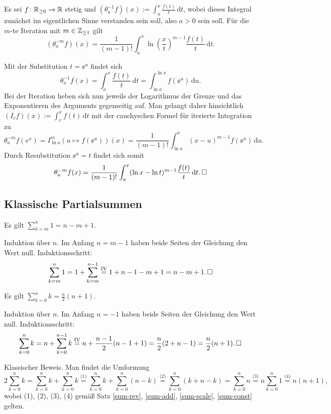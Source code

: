\newpage
\begin{Satz}
Es sei $f\colon\mathbb R_{\ge 0}\to\mathbb R$ stetig und
$(\theta_a^{-1} f)(x):=\int_a^x\frac{f(t)}{t}\,\mathrm dt$,
wobei dieses Integral zunächst im eigentlichen Sinne verstanden sein
soll, also $a>0$ sein soll. Für die $m$-te Iteration mit
$m\in\mathbb Z_{\ge 1}$ gilt%
\[(\theta_a^{-m}f)(x) = \frac{1}{(m-1)!}\int_a^x\ln\left(\frac{x}{t}\right)^{m-1}
\frac{f(t)}{t}\,\mathrm dt.\]
\end{Satz}
Mit der Substitution $t=\ee^u$ findet sich%
\[\theta_a^{-1} f(x) = \int_a^x\frac{f(t)}{t}\,\mathrm dt
= \int_{\ln a}^{\ln x} f(\ee^u)\,\mathrm du.\]
Bei der Iteration heben sich nun jeweils der Logarithmus der Grenze und
das Exponentieren des Arguments gegenseitig auf. Man gelangt daher
hinsichtlich $(I_c f)(x):=\int_c^x f(t)\,\mathrm dt$ mit
der cauchyschen Formel für iterierte Integration zu%
\[\theta_a^{-m} f(e^x) = I_{\ln a}^m (u\mapsto f(\ee^u))(x)
= \frac{1}{(m-1)!}\int_{\ln a}^x (x-u)^{m-1}f(\ee^u)\,\mathrm du.\]
Durch Resubstitution $\ee^u=t$ findet sich somit%
\[\theta_a^{-m} f(x) = \frac{1}{(m-1)!}\int_a^x(\ln x-\ln t)^{m-1}
\frac{f(t)}{t}\,\mathrm dt.\,\square\]

\newpage
\subsection{Klassische Partialsummen}

\begin{Satz}%
\label{sum-const}\newlinefirst
Es gilt $\displaystyle\sum_{k=m}^n 1 = n-m+1$.
\end{Satz}
\begin{Beweis}
Induktion über $n$. Im Anfang $n=m-1$ haben beide Seiten
der Gleichung den Wert null. Induktionsschritt:
\[\sum_{k=m}^n 1 = 1 + \sum_{k=m}^{n-1}
\stackrel{\mathrm{IV}}= 1 + n-1-m+1 = n-m+1.\,\square\]
\end{Beweis}

\begin{Satz}%
\newlinefirst
Es gilt $\displaystyle\sum_{k=0}^n k = \frac{n}{2}(n+1)$.
\end{Satz}
\begin{Beweis}[Beweis 1]
Induktion über $n$. Im Anfang $n=-1$ haben beide Seiten der Gleichung
den Wert null. Induktionsschritt:
\[\sum_{k=0}^n k = n + \sum_{k=0}^{n-1} k
\stackrel{\mathrm{IV}}= n + \frac{n-1}{2}(n-1+1)
= \frac{n}{2}(2 + n-1) = \frac{n}{2}(n+1).\,\square\]
\end{Beweis}
\begin{Beweis}[Beweis 2]
Klassischer Beweis. Man findet die Umformung
\[2\!\sum_{k=0}^n k = \!\sum_{k=0}^n k + \!\sum_{k=0}^n k
\stackrel{\text{(1)}}= \!\sum_{k=0}^n k + \!\sum_{k=0}^n (n-k)
\stackrel{\text{(2)}}= \!\sum_{k=0}^n (k+n-k)
= \!\sum_{k=0}^n n \stackrel{\text{(3)}}= n\!\sum_{k=0}^n 1
\stackrel{\text{(4)}}= n(n+1),\]
wobei (1), (2), (3), (4) gemäß Satz
\ref{sum-rev}, \ref{sum-add}, \ref{sum-scale}, \ref{sum-const}
gelten.\,\qedsymbol
\end{Beweis}


